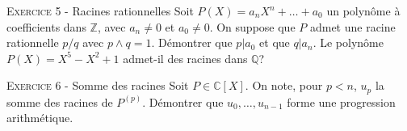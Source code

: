 \documentclass[11pt]{article}
\begin{document}


\vskip0.3cm\noindent\textsc{Exercice 5} - Racines rationnelles
\vskip0.2cm
Soit $P(X)=a_nX^n+\dots+a_0$ un polynôme à coefficients dans $\mathbb Z$, avec
$a_n\neq 0$ et $a_0\neq 0$. On suppose que $P$ admet une racine rationnelle $p/q$
avec $p\wedge q=1$. Démontrer que $p|a_0$ et que $q|a_n$. Le polynôme $P(X)=X^5-X^2+1$
admet-il des racines dans $\mathbb Q$?




\vskip0.3cm\noindent\textsc{Exercice 6} - Somme des racines
\vskip0.2cm
Soit $P\in\mathbb C[X]$. On note, pour $p<n$, $u_p$ la somme des racines de $P^{(p)}$. Démontrer que
$u_0,\dots,u_{n-1}$ forme une progression arithmétique.




\vskip0.5cm

\end{document}
